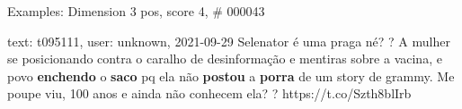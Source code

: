 \begin{frame}{Examples: Dimension 3 pos, score 4, \# 000043}
\footnotesize
\begin{exampleblock}{text: t095111, user: unknown, 2021-09-29}
Selenator é uma praga né? ? A mulher se posicionando contra o caralho de 
desinformação e mentiras sobre a vacina, e povo \textbf{enchendo} o 
\textbf{saco} pq ela não \textbf{postou} a \textbf{porra} de um story de 
grammy. Me poupe viu, 100 anos e ainda não conhecem ela? ? 
https://t.co/Szth8blIrb 
\end{exampleblock}
\end{frame}
